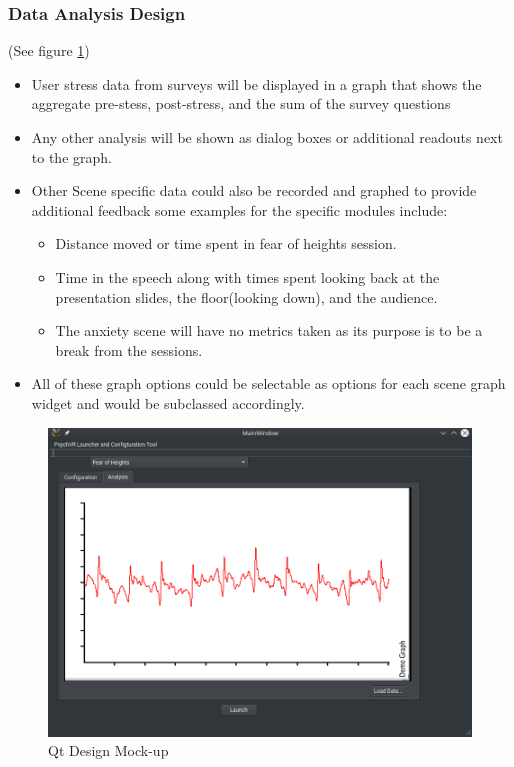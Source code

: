 \documentclass[a4paper,10pt]{article}
\begin{document}
\subsubsection{Data Analysis Design}
(See figure \ref{fig:qtMockupData})
  \begin{itemize}
  \item User stress data from surveys will be displayed in a graph that shows the aggregate pre-stess, post-stress, and the sum of the survey questions
  \item Any other analysis will be shown as dialog boxes or additional readouts next to the graph.
  \item Other Scene specific data could also be recorded and graphed to provide additional feedback some examples for the specific modules include:
	\begin{itemize}
	\item Distance moved or time spent in fear of heights session.
	\item Time in the speech along with times spent looking back at the presentation slides, the floor(looking down), and the audience. 
	\item The anxiety scene will have no metrics taken as its purpose is to be a break from the sessions.
	\end{itemize}
\item All of these graph options could be selectable as options for each scene graph widget and would be subclassed accordingly.
  \end{itemize}
\begin{figure}[H]
				      \centerline{\includegraphics[scale = 0.35]{qtConfigData.png}}
					\caption{Qt Design Mock-up}
					\label{fig:qtMockupData}
				\end{figure}
\end{document}
